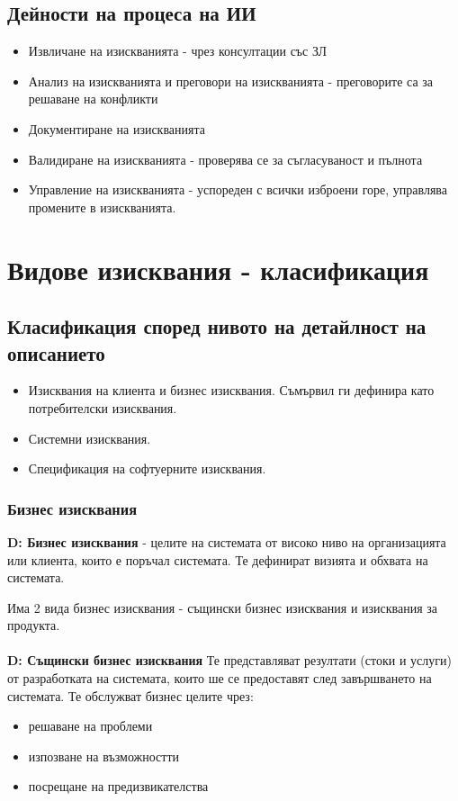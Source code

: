 \documentclass[fleqn,12pt]{article}
\begin{document}
\subsection{Дейности на процеса на ИИ}

\begin{itemize}
	\item Извличане на изискванията - чрез консултации със ЗЛ
	\item Анализ на изискванията и преговори на изискванията - преговорите са за решаване на конфликти
	\item Документиране на изискванията
	\item Валидиране на изискванията - проверява се за съгласуваност и пълнота
	\item Управление на изискванията - успореден с всички изброени горе, управлява промените в изискванията.
\end{itemize}

\section{Видове изисквания - класификация}

\subsection{Класификация според нивото на детайлност на описанието}

\begin{itemize}
	\item Изисквания на клиента и бизнес изисквания. Съмървил ги дефинира като потребителски изисквания.
	\item Системни изисквания.
	\item Спецификация на софтуерните изисквания.
\end{itemize}

\subsubsection{Бизнес изисквания}
\textbf{D: Бизнес изисквания} - целите на системата от високо ниво на организацията или клиента, които е поръчал системата. Те дефинират визията и обхвата на системата.

Има 2 вида бизнес изисквания - същински бизнес изисквания и изисквания за продукта.

\paragraph{}
\textbf{D: Същински бизнес изисквания} Те представляват резултати (стоки и услуги) от разработката на системата, които ше се предоставят след завършването на системата. Те обслужват бизнес целите чрез:
\begin{itemize}
	\item решаване на проблеми
	\item изпозване на възможностти
	\item посрещане на предизвикателства
\end{itemize}
\end{document}
